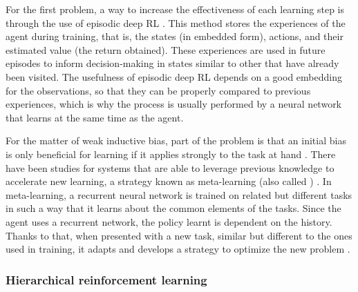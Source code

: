 For the first problem, a way to increase the effectiveness of each learning step is through the use of episodic deep RL \cite{Botvinick:2019,Pritzel:2017}. This method stores the experiences of the agent during training, that is, the states (in embedded form), actions, and their estimated value (the return obtained). These experiences are used in future episodes to inform decision-making in states similar to other that have already been visited. The usefulness of episodic deep RL depends on a good embedding for the observations, so that they can be properly compared to previous experiences, which is why the process is usually performed by a neural network that learns at the same time as the agent.

For the matter of weak inductive bias, part of the problem is that an initial bias is only beneficial for learning if it applies strongly to the task at hand \cite{Botvinick:2019}. There have been studies for systems that are able to leverage previous knowledge to accelerate new learning, a strategy known as meta-learning (also called ) \cite{Botvinick:2019}. In meta-learning, a recurrent neural network is trained on related but different tasks in such a way that it learns about the common elements of the tasks. Since the agent uses a recurrent network, the policy learnt is dependent on the history. Thanks to that, when presented with a new task, similar but different to the ones used in training, it adapts and develops a strategy to optimize the new problem \cite{Wang:2017}.

\subsubsection*{Hierarchical reinforcement learning}



